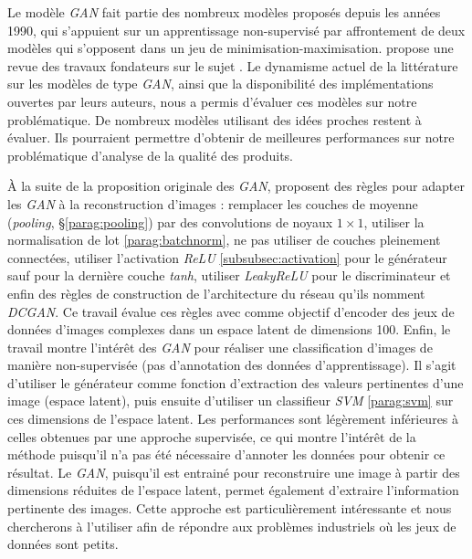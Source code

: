 Le modèle \textit{GAN} fait partie des nombreux modèles proposés depuis les années 1990, qui s'appuient sur un apprentissage non-supervisé par affrontement de deux modèles qui s'opposent dans un jeu de minimisation-maximisation.
\citeauthor{schmidhuber_unsupervised_2019} propose une revue des travaux fondateurs sur le sujet \cite{schmidhuber_unsupervised_2019}.
Le dynamisme actuel de la littérature sur les modèles de type \textit{GAN}, ainsi que la disponibilité des implémentations ouvertes par leurs auteurs, nous a permis d'évaluer ces modèles sur notre problématique.
De nombreux modèles utilisant des idées proches restent à évaluer.
Ils pourraient permettre d'obtenir de meilleures performances sur notre problématique d'analyse de la qualité des produits.

À la suite de la proposition originale des \textit{GAN}, \citeauthor{radford_unsupervised_2015} \cite{radford_unsupervised_2015} proposent des règles pour adapter les \textit{GAN} à la reconstruction d'images : remplacer les couches de moyenne (\textit{pooling}, §\ref{parag:pooling}) par des convolutions de noyaux $1 \times 1$, utiliser la normalisation de lot \ref{parag:batchnorm}, ne pas utiliser de couches pleinement connectées, utiliser l'activation \textit{ReLU} \ref{subsubsec:activation} pour le générateur sauf pour la dernière couche \textit{tanh}, utiliser \textit{LeakyReLU} pour le discriminateur et enfin des règles de construction de l'architecture du réseau qu'ils nomment \textit{DCGAN}.
Ce travail évalue ces règles avec comme objectif d'encoder des jeux de données d'images complexes dans un espace latent de dimensions 100.
Enfin, le travail montre l'intérêt des \textit{GAN} pour réaliser une classification d'images de manière non-supervisée (pas d'annotation des données d'apprentissage).
Il s'agit d'utiliser le générateur comme fonction d'extraction des valeurs pertinentes d'une image (espace latent), puis ensuite d'utiliser un classifieur \textit{SVM} \ref{parag:svm} sur ces dimensions de l'espace latent.
Les performances sont légèrement inférieures à celles obtenues par une approche supervisée, ce qui montre l'intérêt de la méthode puisqu'il n'a pas été nécessaire d'annoter les données pour obtenir ce résultat.
Le \textit{GAN}, puisqu'il est entrainé pour reconstruire une image à partir des dimensions réduites de l'espace latent, permet également d'extraire l'information pertinente des images.
Cette approche est particulièrement intéressante et nous chercherons à l'utiliser afin de répondre aux problèmes industriels où les jeux de données sont petits.

